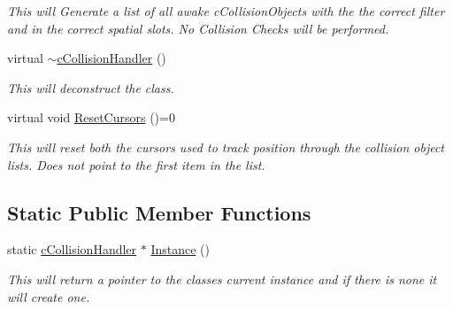\begin{DoxyCompactItemize}
\begin{DoxyCompactList}\small\item\em This will Generate a list of all awake cCollisionObjects with the the correct filter and in the correct spatial slots. No Collision Checks will be performed. \end{DoxyCompactList}\item 
\hypertarget{classc_collision_handler_a5810098e3ca35eac5cb23936840787ef}{
virtual \hyperlink{classc_collision_handler_a5810098e3ca35eac5cb23936840787ef}{$\sim$cCollisionHandler} ()}
\label{classc_collision_handler_a5810098e3ca35eac5cb23936840787ef}

\begin{DoxyCompactList}\small\item\em This will deconstruct the class. \end{DoxyCompactList}\item 
\hypertarget{classc_collision_handler_a4fe00bffd2defe0a71a17c5fadd3b890}{
virtual void \hyperlink{classc_collision_handler_a4fe00bffd2defe0a71a17c5fadd3b890}{ResetCursors} ()=0}
\label{classc_collision_handler_a4fe00bffd2defe0a71a17c5fadd3b890}

\begin{DoxyCompactList}\small\item\em This will reset both the cursors used to track position through the collision object lists. Does not point to the first item in the list. \end{DoxyCompactList}\end{DoxyCompactItemize}
\subsection*{Static Public Member Functions}
\begin{DoxyCompactItemize}
\item 
\hypertarget{classc_collision_handler_a04d5c8d5b7ac854b4958dca195bf1c1b}{
static \hyperlink{classc_collision_handler}{cCollisionHandler} $\ast$ \hyperlink{classc_collision_handler_a04d5c8d5b7ac854b4958dca195bf1c1b}{Instance} ()}
\label{classc_collision_handler_a04d5c8d5b7ac854b4958dca195bf1c1b}

\begin{DoxyCompactList}\small\item\em This will return a pointer to the classes current instance and if there is none it will create one. \end{DoxyCompactList}\end{DoxyCompactItemize}
